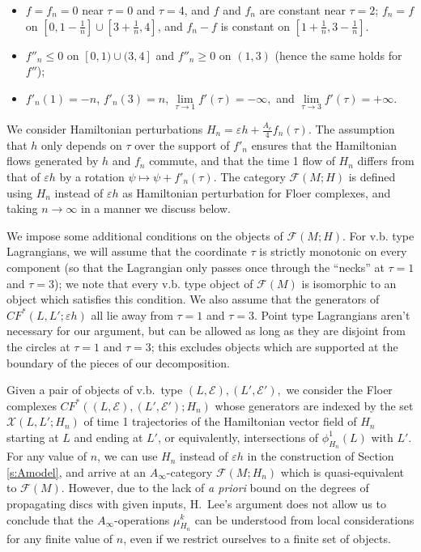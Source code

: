 \documentclass[11pt,leqno]{amsart}
\numberwithin{equation}{section}
\newcommand{\cF}{{\mathcal F}}
\newcommand{\cE}{{\mathcal E}}
\newcommand{\cX}{{\mathcal X}}
\begin{document}
\begin{itemize}
\item[(i)] $f=f_n=0$ near $\tau=0$ and $\tau=4$, and $f$ and $f_n$ are constant
near $\tau=2$; $f_n=f$ on $[0,1-\frac1n]\cup [3+\frac1n,4]$, and $f_n-f$ is
constant on $[1+\frac1n,3-\frac1n]$.

\item[(ii)] $f''_n\leq 0$ on $[0,1)\cup (3,4]$ and $f''_n\geq 0$ on $(1,3)$
(hence the same holds for $f''$);

\item[(iii)] $f'_n(1)=-n$, $f'_n(3)=n$, $\lim\limits_{\tau\to 1}f'(\tau)=-\infty,$ and $\lim\limits_{\tau\to 3}f'(\tau)=+\infty.$
\end{itemize}

\noindent 
We consider Hamiltonian perturbations $H_n=\varepsilon h+\frac{A_e}{4}f_n(\tau)$. The
assumption that $h$ only depends on $\tau$ over the support of $f'_n$ ensures
that the Hamiltonian flows generated by $h$ and $f_n$ commute, and that
the time 1 flow of $H_n$ differs from that of $\varepsilon h$ by a rotation
$\psi\mapsto \psi+f'_n(\tau)$.  The category $\cF(M;H)$ is defined using
$H_n$ instead of $\varepsilon h$ as Hamiltonian perturbation for Floer
complexes, and taking $n\to \infty$ in a manner we discuss below.

We impose some additional conditions on the objects of $\cF(M;H)$.
For v.b. type Lagrangians, we will assume that the coordinate $\tau$ is strictly 
monotonic on every component (so that the Lagrangian only passes once
through the ``necks'' at $\tau=1$ and $\tau=3$); we note that every v.b.
type object of $\cF(M)$ is isomorphic to an object which satisfies this
condition. We also assume that the generators of $CF^*(L,L';\varepsilon h)$ all lie away from $\tau=1$
and $\tau=3$. Point type Lagrangians aren't necessary for our argument, but can
be allowed as long as they are disjoint from the
circles at $\tau=1$ and $\tau=3$; this excludes objects which are supported at the
boundary of the pieces of our decomposition.

Given a pair of objects of v.b.~type $(L,\cE),(L',\cE'),$ we consider the Floer complexes 
$CF^*((L,\cE),(L',\cE');H_n)$ whose generators are indexed by the set
$\cX(L,L';H_n)$ of time 1 trajectories of the
Hamiltonian vector field of $H_n$ starting at $L$ and ending at $L'$, or
equivalently, intersections of $\phi^1_{H_n}(L)$ with $L'$. 
For any value of $n$, we can use $H_n$ instead of $\varepsilon h$ in the
construction of Section \ref{s:Amodel}, and arrive at an $A_\infty$-category
$\cF(M;H_n)$ which is quasi-equivalent to $\cF(M)$. However, due to the lack of {\em a
priori} bound on the degrees of propagating discs with given inputs,
H.\ Lee's argument \cite{Lee} does not allow us to conclude that
the $A_\infty$-operations $\mu^k_{H_n}$ can be understood from local
considerations for any finite value of $n$, even if we restrict ourselves to
a finite set of objects.
\end{document}
